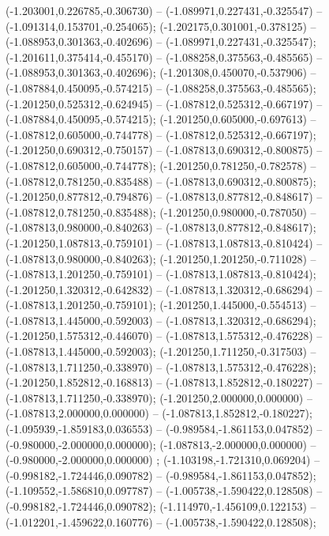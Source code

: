  (-1.203001,0.226785,-0.306730) -- (-1.089971,0.227431,-0.325547) -- (-1.091314,0.153701,-0.254065);
 (-1.202175,0.301001,-0.378125) -- (-1.088953,0.301363,-0.402696) -- (-1.089971,0.227431,-0.325547);
 (-1.201611,0.375414,-0.455170) -- (-1.088258,0.375563,-0.485565) -- (-1.088953,0.301363,-0.402696);
 (-1.201308,0.450070,-0.537906) -- (-1.087884,0.450095,-0.574215) -- (-1.088258,0.375563,-0.485565);
 (-1.201250,0.525312,-0.624945) -- (-1.087812,0.525312,-0.667197) -- (-1.087884,0.450095,-0.574215);
 (-1.201250,0.605000,-0.697613) -- (-1.087812,0.605000,-0.744778) -- (-1.087812,0.525312,-0.667197);
 (-1.201250,0.690312,-0.750157) -- (-1.087813,0.690312,-0.800875) -- (-1.087812,0.605000,-0.744778);
 (-1.201250,0.781250,-0.782578) -- (-1.087812,0.781250,-0.835488) -- (-1.087813,0.690312,-0.800875);
 (-1.201250,0.877812,-0.794876) -- (-1.087813,0.877812,-0.848617) -- (-1.087812,0.781250,-0.835488);
 (-1.201250,0.980000,-0.787050) -- (-1.087813,0.980000,-0.840263) -- (-1.087813,0.877812,-0.848617);
 (-1.201250,1.087813,-0.759101) -- (-1.087813,1.087813,-0.810424) -- (-1.087813,0.980000,-0.840263);
 (-1.201250,1.201250,-0.711028) -- (-1.087813,1.201250,-0.759101) -- (-1.087813,1.087813,-0.810424);
 (-1.201250,1.320312,-0.642832) -- (-1.087813,1.320312,-0.686294) -- (-1.087813,1.201250,-0.759101);
 (-1.201250,1.445000,-0.554513) -- (-1.087813,1.445000,-0.592003) -- (-1.087813,1.320312,-0.686294);
 (-1.201250,1.575312,-0.446070) -- (-1.087813,1.575312,-0.476228) -- (-1.087813,1.445000,-0.592003);
 (-1.201250,1.711250,-0.317503) -- (-1.087813,1.711250,-0.338970) -- (-1.087813,1.575312,-0.476228);
 (-1.201250,1.852812,-0.168813) -- (-1.087813,1.852812,-0.180227) -- (-1.087813,1.711250,-0.338970);
 (-1.201250,2.000000,0.000000) -- (-1.087813,2.000000,0.000000) -- (-1.087813,1.852812,-0.180227);
 (-1.095939,-1.859183,0.036553) -- (-0.989584,-1.861153,0.047852) -- (-0.980000,-2.000000,0.000000);
 (-1.087813,-2.000000,0.000000) -- (-0.980000,-2.000000,0.000000) ;
 (-1.103198,-1.721310,0.069204) -- (-0.998182,-1.724446,0.090782) -- (-0.989584,-1.861153,0.047852);
 (-1.109552,-1.586810,0.097787) -- (-1.005738,-1.590422,0.128508) -- (-0.998182,-1.724446,0.090782);
 (-1.114970,-1.456109,0.122153) -- (-1.012201,-1.459622,0.160776) -- (-1.005738,-1.590422,0.128508);
